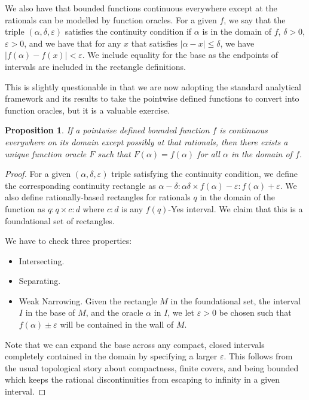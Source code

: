 \documentclass[12pt]{article}
\newtheorem{proposition}{Proposition}[subsection]
\begin{document}
We also have that bounded functions continuous everywhere except at the rationals can be modelled by function oracles. For a given $f$, we say that the triple $(\alpha, \delta, \varepsilon)$ satisfies the continuity condition if $\alpha$ is in the domain of $f$, $\delta > 0$, $\varepsilon > 0$, and we have that for any $x$ that satisfies $|\alpha - x| \leq \delta$, we have $|f(\alpha) - f(x) | < \varepsilon$. We include equality for the base as the endpoints of intervals are included in the rectangle definitions.

This is slightly questionable in that we are now adopting the standard analytical framework and its results to take the pointwise defined functions to convert into function oracles, but it is a valuable exercise. 

\begin{proposition}
    If a pointwise defined bounded function $f$ is continuous everywhere on its domain except possibly at that rationals, then there exists a unique function oracle $F$ such that $F(\alpha) = f(\alpha)$ for all $\alpha$ in the domain of $f$.
\end{proposition}

\begin{proof}
    For a given $(\alpha, \delta, \varepsilon)$ triple satisfying the continuity condition, we define the corresponding continuity rectangle as $\alpha-\delta : \alpha \delta \times f(\alpha)-\varepsilon: f(\alpha)+\varepsilon$. We also define rationally-based rectangles for rationals $q$ in the domain of the function as $q:q \times c:d$ where $c:d$ is any $f(q)$-Yes interval. We claim that this is a foundational set of rectangles. 

    We have to check three properties:

    \begin{itemize}
        \item Intersecting. 
        \item Separating. 
        \item Weak Narrowing. Given the rectangle $M$ in the foundational set, the interval $I$ in the base of $M$, and the oracle $\alpha$ in $I$, we let $\varepsilon > 0$ be chosen such that $f(\alpha)\pm \varepsilon$ will be contained in the wall of $M$. 
    \end{itemize}

    Note that we can expand the base across any compact, closed intervals completely contained in the domain by specifying a larger $\varepsilon$. This follows from the usual topological story about compactness, finite covers, and being bounded which keeps the rational discontinuities from escaping to infinity in a given interval. 
    
\end{proof}
\end{document}
